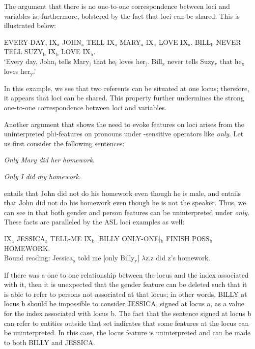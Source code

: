 \documentclass[output=paper,
modfonts
]{langscibook}
\begin{document}
The argument that there is no one-to-one correspondence between loci and variables is, furthermore, bolstered by the fact that loci can be shared. This is illustrated below: 

\begin{exe} 
	\ex \label{ex:irani:69} EVERY-DAY, IX$_\text{a}$ JOHN$_\text{a}$ TELL IX$_\text{a}$ MARY$_\text{a}$ IX$_\text{a}$ LOVE IX$_\text{a}$. BILL$_\text{b}$ NEVER TELL SUZY$_\text{b}$ IX$_\text{b}$ LOVE IX$_\text{b}$. \\
	`Every day, John$_\text{i}$ tells Mary$_\text{j}$ that he$_\text{i}$ loves her$_\text{j}$. Bill$_\text{x}$ never tells Suzy$_\text{y}$ that he$_\text{x}$ loves her$_\text{y}$.’
\end{exe} 

In this example, we see that two referents can be situated at one locus; therefore, it appears that loci can be shared. This property further undermines the strong one-to-one correspondence between loci and variables.  

Another argument that shows the need to evoke features on loci arises from the uninterpreted phi-features on pronouns under -sensitive operators like \textit{only}. Let us first consider the following  sentences: 

\begin{exe} 
	\ex \label{ex:irani:70} \textit{Only Mary did her homework.}
	
	\ex \label{ex:irani:71} \textit{Only I did my homework.}
\end{exe} 

 entails that John did not do his homework even though he is male, and  entails that John did not do his homework even though he is not the speaker. Thus, we can see in  that both gender and person features can be uninterpreted under \textit{only}. These facts are paralleled by the ASL loci examples as well: \newpage

\begin{exe} 
	\ex IX$_\text{a}$ JESSICA$_\text{a}$ TELL-ME IX$_\text{b}$ [BILLY ONLY-ONE]$_\text{b}$ FINISH POSS$_\text{b}$ \\ HOMEWORK.\\
	Bound reading: Jessica$_\text{x}$ told me [only Billy$_\text{y}$] \(\lambda\)z.z did z’s homework. \citep[9]{Kuhn2015}
\end{exe}

If there was a one to one relationship between the locus and the index associated with it, then it is unexpected that the gender feature can be deleted such that it is able to refer to persons not associated at that locus; in other words, BILLY at locus b should be impossible to consider JESSICA, signed at locus a, as a value for the index associated with locus b. The fact that the sentence signed at locus b can refer to entities outside that set indicates that some features at the locus can be uninterpreted. In this case, the locus feature is uninterpreted and  can be made to both BILLY and JESSICA. 
\end{document}
